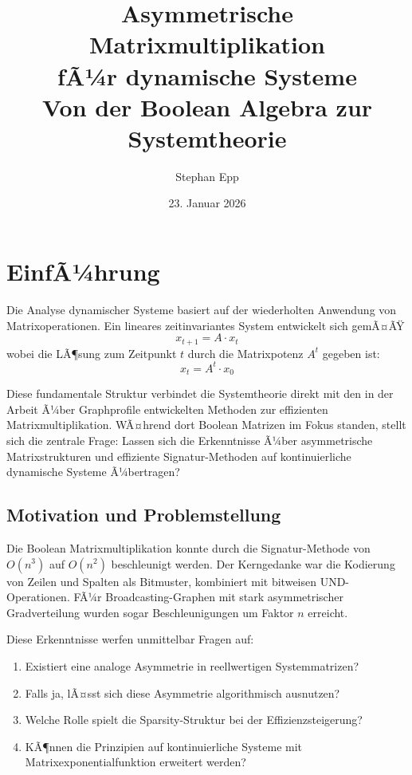 ﻿\documentclass[a4paper,12pt]{report}
\title{\textbf{Asymmetrische Matrixmultiplikation\\ fÃ¼r dynamische Systeme} \\[0.5ex]\large Von der Boolean Algebra zur Systemtheorie}
\author{Stephan Epp}
\date{23. Januar 2026}
\theoremstyle{definition}
\begin{document}
	
	\maketitle
	\tableofcontents
	\newpage
	
	\chapter{EinfÃ¼hrung}
	
	Die Analyse dynamischer Systeme basiert auf der wiederholten Anwendung von Matrixoperationen. Ein lineares zeitinvariantes System entwickelt sich gemÃ¤ÃŸ
	\[
	x_{t+1} = A \cdot x_t
	\]
	wobei die LÃ¶sung zum Zeitpunkt $t$ durch die Matrixpotenz $A^t$ gegeben ist:
	\[
	x_t = A^t \cdot x_0
	\]
	
	Diese fundamentale Struktur verbindet die Systemtheorie direkt mit den in der Arbeit Ã¼ber Graphprofile entwickelten Methoden zur effizienten Matrixmultiplikation. WÃ¤hrend dort Boolean Matrizen im Fokus standen, stellt sich die zentrale Frage: Lassen sich die Erkenntnisse Ã¼ber asymmetrische Matrixstrukturen und effiziente Signatur-Methoden auf kontinuierliche dynamische Systeme Ã¼bertragen?
	
	\section{Motivation und Problemstellung}
	
	Die Boolean Matrixmultiplikation konnte durch die Signatur-Methode von $O(n^3)$ auf $O(n^2)$ beschleunigt werden. Der Kerngedanke war die Kodierung von Zeilen und Spalten als Bitmuster, kombiniert mit bitweisen UND-Operationen. FÃ¼r Broadcasting-Graphen mit stark asymmetrischer Gradverteilung wurden sogar Beschleunigungen um Faktor $n$ erreicht.
	
	Diese Erkenntnisse werfen unmittelbar Fragen auf:
	
	\begin{enumerate}
		\item Existiert eine analoge Asymmetrie in reellwertigen Systemmatrizen?
		\item Falls ja, lÃ¤sst sich diese Asymmetrie algorithmisch ausnutzen?
		\item Welche Rolle spielt die Sparsity-Struktur bei der Effizienzsteigerung?
		\item KÃ¶nnen die Prinzipien auf kontinuierliche Systeme mit Matrixexponentialfunktion erweitert werden?
	\end{enumerate}
	
\end{document}
